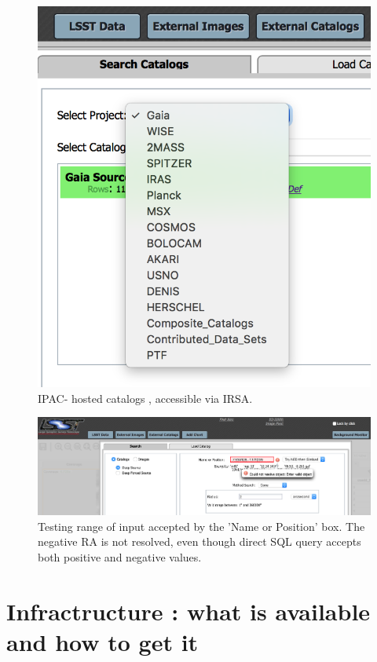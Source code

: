 \documentclass[DM,lsstdraft,toc,usenatbib]{lsstdoc}
\begin{document}
\begin{figure}
\begin{centering}
\includegraphics[width=0.5\columnwidth]{figs/2_PDAC_externals}
\caption{IPAC- hosted catalogs , accessible via IRSA. }
\label{fig:PDAC_external_cat}
\end{centering}
\end{figure}



\begin{figure}
\includegraphics[width = \textwidth]{figs/1_PDAC_interface_a}
\caption{Testing range of input accepted by the 'Name or Position' box. The negative RA is not resolved, even though direct SQL query accepts both positive and negative values.}
\label{fig:PDAC_test1}
\end{figure}




\section{Infractructure : what is available and how to get it }
\label{sec:infra}
\end{document}

